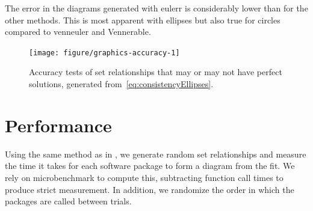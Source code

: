 \documentclass[
  oneside,
  openany,
  numbers=noendperiod,
  parskip=half,
  bibliography=totoc
]{scrbook}\usepackage[]{graphicx}\usepackage{xcolor}
\newenvironment{knitrout}{}{} %
\newcommand{\pkg}[1]{{\fontseries{b}\selectfont #1}}
\begin{document}
\begin{alg}
\DontPrintSemicolon
{}
\end{alg}

The error in the diagrams generated with \pkg{eulerr} is considerably lower
than for the other methods. This is most apparent with ellipses but also true
for circles compared to \pkg{venneuler} and \pkg{Vennerable}.

\begin{figure}[hbt]
\begin{knitrout}\small
{}\color{fgcolor}

{\centering \texttt{[image: figure/graphics-accuracy-1]} 

}



\end{knitrout}
\caption{Accuracy tests of set relationships that may or may not have perfect
solutions, generated from~\eqref{eq:consistencyEllipses}.}
\label{fig:accuracy}
\end{figure}

\section{Performance}
\label{sec:performance}

Using the same method as in , we generate random set
relationships and measure the time it takes for each software package to form a
diagram from the fit. We rely on \pkg{microbenchmark} to compute this,
subtracting function call times to produce strict measurement. In addition, we
randomize the order in which the packages are called between trials.
\end{document}
